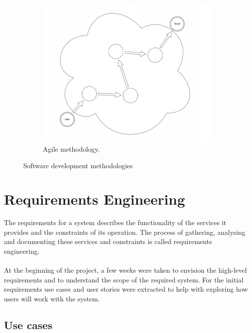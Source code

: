 \documentclass{l4proj}
\begin{document}
\begin{figure}[H]
\begin{subfigure}{.3\textwidth}
	\centering
	\includegraphics[width=\textwidth]{images/projectAgile}
	\caption{Agile methodology.}
	\label{projectAgile}
\end{subfigure}
\caption{Software development methodologies}
\end{figure}



\section{Requirements Engineering}
\paragraph{}
The requirements for a system describes the functionality of the services it provides and the constraints of its operation. The process of gathering, analysing and documenting these services and constraints is called requirements engineering.
\paragraph{}
At the beginning of the project, a few weeks were taken to envision the high-level requirements and to understand the scope of the required system. For the initial requirements use cases and user stories were extracted to help with exploring how users will work with the system. 

\subsection{Use cases} 
\label{sec:usecases}
\end{document}
